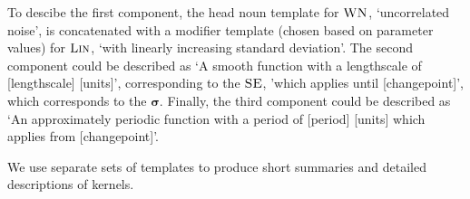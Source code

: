 \documentclass[letterpaper]{article}
\def\eg{e.g.\ }
\begin{document}
To descibe the first component, the head noun template for ${\textsc{WN}}$, `uncorrelated noise', is concatenated with a modifier template (chosen based on parameter values) for ${\textsc{Lin}}$, `with linearly increasing standard deviation'.
%
The second component could be described as `A smooth function with a lengthscale of [lengthscale] [units]', corresponding to the ${\textsc{SE}}$, 'which applies until [changepoint]', which corresponds to the $\boldsymbol{\sigma}$.
%
Finally, the third component could be described as `An approximately periodic function with a period of [period] [units] which applies from [changepoint]'.



We use separate sets of templates to produce short summaries and detailed descriptions of kernels.






\end{document}
